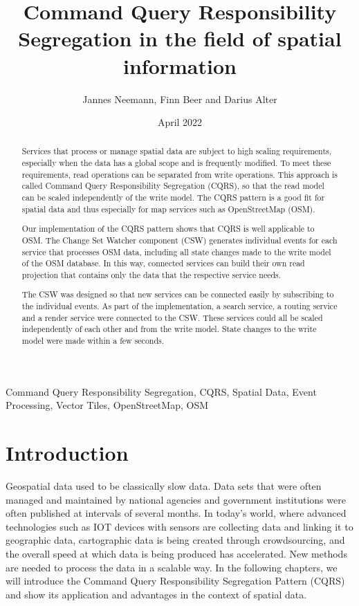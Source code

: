 \documentclass[conference]{IEEEtran}
\title{Command Query Responsibility Segregation in the field of spatial information}
\author{Jannes Neemann, Finn Beer and Darius Alter}
\date{April 2022}
\begin{document}
\maketitle

\begin{abstract}
Services that process or manage spatial data are subject to high scaling requirements, especially when the data has a global scope and is frequently modified. To meet these requirements, read operations can be separated from write operations. This approach is called Command Query Responsibility Segregation (CQRS), so that the read model can be scaled independently of the write model. The CQRS pattern is a good fit for spatial data and thus especially for map services such as OpenStreetMap (OSM).

Our implementation of the CQRS pattern shows that CQRS is well applicable to OSM. The Change Set Watcher component (CSW) generates individual events for each service that processes OSM data, including all state changes made to the write model of the OSM database. In this way, connected services can build their own read projection that contains only the data that the respective service needs.

The CSW was designed so that new services can be connected easily by subscribing to the individual events. As part of the implementation, a search service, a routing service and a render service were connected to the CSW. These services could all be scaled independently of each other and from the write model. State changes to the write model were made within a few seconds.
\end{abstract}

\begin{IEEEkeywords}
Command Query Responsibility Segregation, CQRS, Spatial Data, Event Processing, Vector Tiles, OpenStreetMap, OSM
\end{IEEEkeywords}

\section{Introduction}
\label{sec:Introduction}

Geospatial data used to be classically slow data. Data sets that were often managed and maintained by national agencies and government institutions were often published at intervals of several months. In today's world, where advanced technologies such as IOT devices with sensors are collecting data and linking it to geographic data, cartographic data is being created through crowdsourcing, and the overall speed at which data is being produced has accelerated. \cite{sveen_event-based_nodate} New methods are needed to process the data in a scalable way. In the following chapters, we will introduce the Command Query Responsibility Segregation Pattern (CQRS) and show its application and advantages in the context of spatial data.
\end{document}

